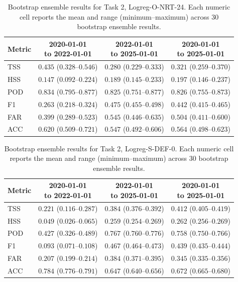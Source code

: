 \begin{table}[htbp]
\centering
\small
\caption{Bootstrap ensemble results for Task 2, Logreg-O-NRT-24. Each numeric cell reports the mean and range (minimum--maximum) across 30 bootstrap ensemble results.}
\label{tab:app-task2-logreg-o-nrt-24}
\begin{tabular}{lccc}
\toprule
Metric & \shortstack{2020-01-01\\to 2022-01-01} & \shortstack{2022-01-01\\to 2025-01-01} & \shortstack{2020-01-01\\to 2025-01-01} \\
\midrule
TSS & $0.435$ ($0.328$--$0.546$) & $0.280$ ($0.229$--$0.333$) & $0.321$ ($0.259$--$0.370$) \\
HSS & $0.147$ ($0.092$--$0.224$) & $0.189$ ($0.145$--$0.233$) & $0.197$ ($0.146$--$0.237$) \\
POD & $0.834$ ($0.795$--$0.877$) & $0.825$ ($0.751$--$0.877$) & $0.826$ ($0.755$--$0.873$) \\
F1 & $0.263$ ($0.218$--$0.324$) & $0.475$ ($0.455$--$0.498$) & $0.442$ ($0.415$--$0.465$) \\
FAR & $0.399$ ($0.289$--$0.523$) & $0.545$ ($0.446$--$0.635$) & $0.504$ ($0.411$--$0.600$) \\
ACC & $0.620$ ($0.509$--$0.721$) & $0.547$ ($0.492$--$0.606$) & $0.564$ ($0.498$--$0.623$) \\
\bottomrule
\end{tabular}
\end{table}
\clearpage

\begin{table}[htbp]
\centering
\small
\caption{Bootstrap ensemble results for Task 2, Logreg-S-DEF-0. Each numeric cell reports the mean and range (minimum--maximum) across 30 bootstrap ensemble results.}
\label{tab:app-task2-logreg-s-def-0}
\begin{tabular}{lccc}
\toprule
Metric & \shortstack{2020-01-01\\to 2022-01-01} & \shortstack{2022-01-01\\to 2025-01-01} & \shortstack{2020-01-01\\to 2025-01-01} \\
\midrule
TSS & $0.221$ ($0.116$--$0.287$) & $0.384$ ($0.376$--$0.392$) & $0.412$ ($0.405$--$0.419$) \\
HSS & $0.049$ ($0.026$--$0.065$) & $0.259$ ($0.254$--$0.269$) & $0.262$ ($0.256$--$0.269$) \\
POD & $0.427$ ($0.326$--$0.489$) & $0.767$ ($0.760$--$0.776$) & $0.758$ ($0.750$--$0.766$) \\
F1 & $0.093$ ($0.071$--$0.108$) & $0.467$ ($0.464$--$0.473$) & $0.439$ ($0.435$--$0.444$) \\
FAR & $0.207$ ($0.199$--$0.214$) & $0.384$ ($0.371$--$0.395$) & $0.345$ ($0.335$--$0.356$) \\
ACC & $0.784$ ($0.776$--$0.791$) & $0.647$ ($0.640$--$0.656$) & $0.672$ ($0.665$--$0.680$) \\
\bottomrule
\end{tabular}
\end{table}
\clearpage

